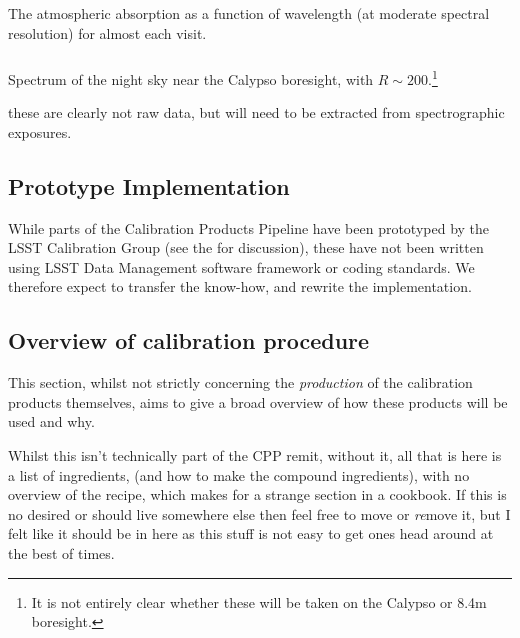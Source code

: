 \subsubsection{}\label{calypso:atmosphericAbsorption}
The atmospheric absorption as a function of wavelength (at moderate spectral resolution) for almost each visit.
\subsubsection{}\label{calypso:nightSkySpectrum}
Spectrum of the night sky near the Calypso boresight, with $R\sim 200$.\footnote{It is not entirely clear whether these will be taken on the Calypso or 8.4m boresight.}

\Nb these are clearly not raw data, but will need to be extracted from spectrographic exposures.





\subsection{Prototype Implementation}

While parts of the Calibration Products Pipeline have been prototyped by the LSST Calibration Group (see the \NewPCP for discussion), these have not been written using LSST Data Management software framework or coding standards. We therefore expect to transfer the know-how, and rewrite the implementation.













\subsection{Overview of calibration procedure}
This section, whilst not strictly concerning the \emph{production} of the calibration products themselves, aims to give a broad overview of how these products will be used and why. 
\begin{note}
Whilst this isn't technically part of the CPP remit, without it, all that is here is a list of ingredients, (and how to make the compound ingredients), with no overview of the recipe, which makes for a strange section in a cookbook. If this is no desired or should live somewhere else then feel free to move or \emph{re}move it, but I felt like it should be in here as this stuff is not easy to get ones head around at the best of times.
\end{note}

